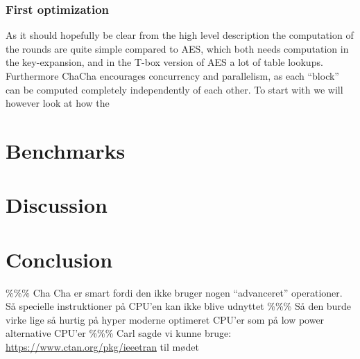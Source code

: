 \documentclass[a4paper]{article}
\begin{document}
\subsubsection{First optimization}
\label{ChaCha1}
As it should hopefully be clear from the high level description the computation of the rounds are quite simple compared to AES, which both needs computation in the key-expansion, and in the T-box version of AES a lot of table lookups. Furthermore ChaCha encourages concurrency and parallelism, as each ``block'' can be computed completely independently of each other. To start with we will however look at how the

\section{Benchmarks}
\label{sec:org1e6546d}

\section{Discussion}
\label{sec:org287c1d2}

\section{Conclusion}
\label{sec:org361d1d7}




\begin{appendix}

\end{appendix}
\%\%\% Cha Cha er smart fordi den ikke bruger nogen ``advanceret'' operationer. Så specielle instruktioner på CPU'en kan ikke blive udnyttet
\%\%\% Så den burde virke lige så hurtig på hyper moderne optimeret CPU'er som på low power alternative CPU'er
\%\%\% Carl sagde vi kunne bruge: \url{https://www.ctan.org/pkg/ieeetran} til mødet
\end{document}

